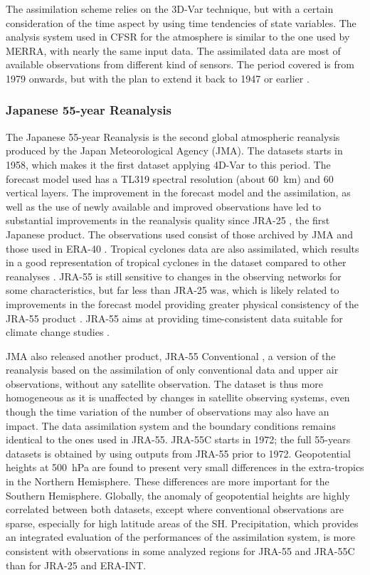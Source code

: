 \documentclass{ametsoc}
\begin{document}
The assimilation scheme relies on the 3D-Var technique, but with a certain consideration of the time aspect by using time tendencies of state variables. The analysis system used in CFSR for the atmosphere is similar to the one used by MERRA, with nearly the same input data. The assimilated data are most of available observations from different kind of sensors. The period covered is from 1979 onwards, but with the plan to extend it back to 1947 or earlier \citep{Saha2010a}.


\subsubsection{Japanese 55-year Reanalysis}

The Japanese 55-year Reanalysis \citep[JRA-55, ][]{Kobayashi2015, Harada2016} is the second global atmospheric reanalysis produced by the Japan Meteorological Agency (JMA). The datasets starts in 1958, which makes it the first dataset applying 4D-Var to this period. The forecast model used has a TL319 spectral resolution (about 60~km) and 60 vertical layers. The improvement in the forecast model and the assimilation, as well as the use of newly available and improved observations have led to substantial improvements in the reanalysis quality since JRA-25 \citep{Kobayashi2015, Harada2016}, the first Japanese product. The observations used consist of those archived by JMA and those used in ERA-40 \citep{Uppala2005}. Tropical cyclones data are also assimilated, which results in a good representation of tropical cyclones in the dataset compared to other reanalyses \citep{Harada2016}. JRA-55 is still sensitive to changes in the observing networks for some characteristics, but far less than JRA-25 was, which is likely related to improvements in the forecast model providing greater physical consistency of the JRA-55 product \citep{Kobayashi2015}. JRA-55 aims at providing time-consistent data suitable for climate change studies \citep{Ebita2011}.

JMA also released another product, JRA-55 Conventional \citep[JRA-55C,][]{Kobayashi2014}, a version of the reanalysis based on the assimilation of only conventional data and upper air observations, without any satellite observation. The dataset is thus more homogeneous as it is unaffected by changes in satellite observing systems, even though the time variation of the number of observations may also have an impact. The data assimilation system and the boundary conditions remains identical to the ones used in JRA-55. JRA-55C starts in 1972; the full 55-years datasets is obtained by using outputs from JRA-55 prior to 1972. Geopotential heights at 500~hPa are found to present very small differences in the extra-tropics in the Northern Hemisphere. These differences are more important for the Southern Hemisphere. Globally, the anomaly  of geopotential heights are highly correlated between both datasets, except where conventional observations are sparse, especially for high latitude areas of the SH. Precipitation, which provides an integrated evaluation of the performances of the assimilation system, is more consistent with observations in some analyzed regions for JRA-55 and JRA-55C than for JRA-25 and ERA-INT.
\end{document}
